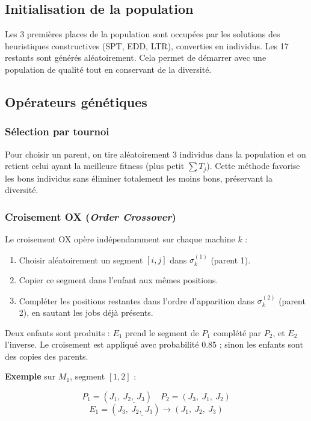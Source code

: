 \subsection{Initialisation de la population}

Les 3 premières places de la population sont occupées par les solutions des heuristiques constructives (SPT, EDD, LTR), converties en individus. Les 17 restants sont générés aléatoirement. Cela permet de démarrer avec une population de qualité tout en conservant de la diversité.

\subsection{Opérateurs génétiques}

\subsubsection{Sélection par tournoi}

Pour choisir un parent, on tire aléatoirement 3 individus dans la population et on retient celui ayant la meilleure fitness (plus petit $\sum T_j$). Cette méthode favorise les bons individus sans éliminer totalement les moins bons, préservant la diversité.

\subsubsection{Croisement OX (\textit{Order Crossover})}

Le croisement OX opère indépendamment sur chaque machine $k$ :

\begin{enumerate}
    \item Choisir aléatoirement un segment $[i, j]$ dans $\sigma_k^{(1)}$ (parent 1).
    \item Copier ce segment dans l'enfant aux mêmes positions.
    \item Compléter les positions restantes dans l'ordre d'apparition dans $\sigma_k^{(2)}$ (parent 2), en sautant les jobs déjà présents.
\end{enumerate}

Deux enfants sont produits : $E_1$ prend le segment de $P_1$ complété par $P_2$, et $E_2$ l'inverse. Le croisement est appliqué avec probabilité $0.85$ ; sinon les enfants sont des copies des parents.

\textbf{Exemple} sur $M_1$, segment $[1, 2]$ :

\[
P_1 = (J_1,\ \underline{J_2,\ J_3}) \quad P_2 = (J_3,\ J_1,\ J_2)
\]
\[
E_1 = (J_3,\ \underline{J_2,\ J_3}) \rightarrow (J_1,\ J_2,\ J_3)
\]

